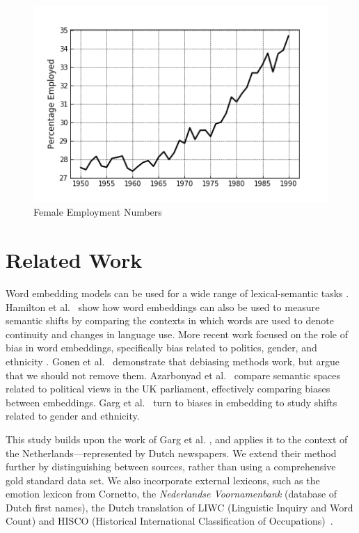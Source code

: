 \documentclass[11pt,a4paper]{article}
\begin{document}
\begin{figure}
  \includegraphics[width=\linewidth]{figures/female_employment}
  \caption{Female Employment Numbers}
  \label{fig:female_employment}
\end{figure}

\section{Related Work}
Word embedding models can be used for a wide range of lexical-semantic tasks \cite{baroni2014don, kulkarni_statistically_2015}. Hamilton et al.~ show how word embeddings can also be used to measure semantic shifts by comparing the contexts in which words are used to denote continuity and changes in language use. More recent work focused on the role of bias in word embeddings, specifically bias related to politics, gender, and ethnicity \cite{azarbonyad_words_2017, bolukbasi_quantifying_2016, garg_word_2018}. Gonen et al.~ demonstrate that debiasing methods work, but argue that we should not remove them. Azarbonyad et al.~ compare semantic spaces related to political views in the UK parliament, effectively comparing biases between embeddings. Garg et al.~ turn to biases in embedding to study shifts related to gender and ethnicity.
 
This study builds upon the work of Garg et al. , and applies it to the context of the Netherlands---represented by Dutch newspapers. We extend their method further by distinguishing between sources, rather than using a comprehensive gold standard data set. We also incorporate external lexicons, such as the emotion lexicon from Cornetto, the \textit{Nederlandse Voornamenbank} (database of Dutch first names), the Dutch translation of LIWC (Linguistic Inquiry and Word Count) and HISCO (Historical International Classification of Occupations)~\cite{vossen_cornetto_2007, tausczik2010psychological, boot_dutch_2017, zijdeman_hsn_2013, bloothooft_nederlandse_2010}.
\end{document}
